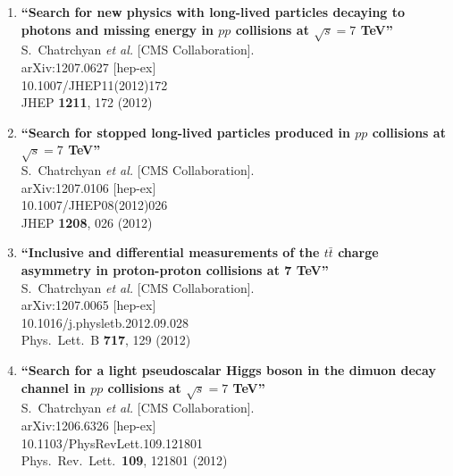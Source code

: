 \documentclass{article}
\begin{document}
\begin{enumerate}
\item%
{\bf ``Search for new physics with long-lived particles decaying to photons and missing energy in $pp$ collisions at $\sqrt{s}=7$ TeV''}
  \\{}S.~Chatrchyan {\it et al.}  [CMS Collaboration].
  \\{}arXiv:1207.0627 [hep-ex]
    \\{}10.1007/JHEP11(2012)172
\\{}JHEP {\bf 1211}, 172 (2012) %


\item%
{\bf ``Search for stopped long-lived particles produced in $pp$ collisions at $\sqrt{s}=7$ TeV''}
  \\{}S.~Chatrchyan {\it et al.}  [CMS Collaboration].
  \\{}arXiv:1207.0106 [hep-ex]
    \\{}10.1007/JHEP08(2012)026
\\{}JHEP {\bf 1208}, 026 (2012) %


\item%
{\bf ``Inclusive and differential measurements of the $t \bar{t}$ charge asymmetry in proton-proton collisions at 7 TeV''}
  \\{}S.~Chatrchyan {\it et al.}  [CMS Collaboration].
  \\{}arXiv:1207.0065 [hep-ex]
    \\{}10.1016/j.physletb.2012.09.028
\\{}Phys.\ Lett.\ B {\bf 717}, 129 (2012) %


\item%
{\bf ``Search for a light pseudoscalar Higgs boson in the dimuon decay channel in $pp$ collisions at $\sqrt{s}=7$ TeV''}
  \\{}S.~Chatrchyan {\it et al.}  [CMS Collaboration].
  \\{}arXiv:1206.6326 [hep-ex]
    \\{}10.1103/PhysRevLett.109.121801
\\{}Phys.\ Rev.\ Lett.\  {\bf 109}, 121801 (2012) %



\end{enumerate}
\end{document}

